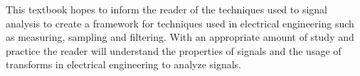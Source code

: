 \documentclass{article}
\begin{document}
    This textbook hopes to inform the reader of the techniques used to signal analysis to create a framework for techniques used in electrical engineering such as measuring, sampling and filtering. With an appropriate amount of study and practice the reader will understand the properties of signals and the usage of transforms in electrical engineering to analyze signals.     
\end{document}
